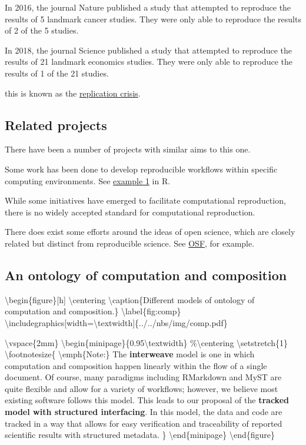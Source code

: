 In 2016, the journal Nature published a study that attempted to reproduce the results of 5 landmark cancer studies. They were only able to reproduce the results of 2 of the 5 studies.

In 2018, the journal Science published a study that attempted to reproduce the results of 21 landmark economics studies. They were only able to reproduce the results of 1 of the 21 studies.

this is known as the \href{https://en.wikipedia.org/wiki/Replication\_crisis}{replication crisis}.

\hypertarget{related-projects}{%
\subsection{Related projects}\label{related-projects}}

There have been a number of projects with similar aims to this one.

Some work has been done to develop reproducible workflows within specific computing environments. See \href{https://mine-cetinkaya-rundel.github.io/improve-repro-workflow-reproducibilitea-2020/}{example 1} in R.

While some initiatives have emerged to facilitate computational reproduction, there is no widely accepted standard for computational reproduction. 

There does exist some efforts around the ideas of open science, which are closely related but distinct from reproducible science. See \href{https://osf.io/tvyxz/}{OSF}, for example.

\hypertarget{an-ontology-of-computation-and-composition}{%
\subsection{An ontology of computation and composition}\label{an-ontology-of-computation-and-composition}}

\textbackslash{}begin\{figure\}[h]
\textbackslash{}centering
\textbackslash{}caption\{Different models of ontology of computation and composition.\}
\textbackslash{}label\{fig:comp\}
\textbackslash{}includegraphics[width=\textbackslash{}textwidth]\{../../nbs/img/comp.pdf\}

\textbackslash{}vspace\{2mm\}
\textbackslash{}begin\{minipage\}\{0.95\textbackslash{}textwidth\}
\%\textbackslash{}centering
\textbackslash{}setstretch\{1\}
\textbackslash{}footnotesize\{
\textbackslash{}emph\{Note:\} The \textbf{interweave} model is one in which computation and composition happen linearly within the flow of a single document. Of course, many paradigms including RMarkdown and MyST are quite flexible and allow for a variety of workflows; however, we believe most existing software follows this model. This leads to our proposal of the \textbf{tracked model with structured interfacing}. In this model, the data and code are tracked in a way that allows for easy verification and traceability of reported scientific results with structured metadata.
\}
\textbackslash{}end\{minipage\}
\textbackslash{}end\{figure\}

